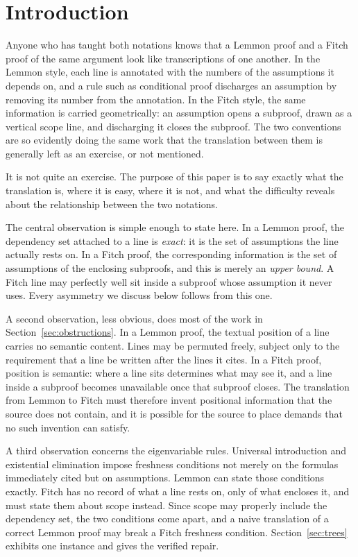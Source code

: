 \documentclass[11pt]{article}
\theoremstyle{plain}
\theoremstyle{definition}
\theoremstyle{remark}
\begin{document}
\section{Introduction}

Anyone who has taught both notations knows that a Lemmon proof and a Fitch
proof of the same argument look like transcriptions of one another. In the
Lemmon style, each line is annotated with the numbers of the assumptions it
depends on, and a rule such as conditional proof discharges an assumption by
removing its number from the annotation. In the Fitch style, the same
information is carried geometrically: an assumption opens a subproof, drawn as
a vertical scope line, and discharging it closes the subproof. The two
conventions are so evidently doing the same work that the translation between
them is generally left as an exercise, or not mentioned.

It is not quite an exercise. The purpose of this paper is to say exactly what
the translation is, where it is easy, where it is not, and what the difficulty
reveals about the relationship between the two notations.

The central observation is simple enough to state here. In a Lemmon proof, the
dependency set attached to a line is \emph{exact}: it is the set of
assumptions the line actually rests on. In a Fitch proof, the corresponding
information is the set of assumptions of the enclosing subproofs, and this is
merely an \emph{upper bound}. A Fitch line may perfectly well sit inside a
subproof whose assumption it never uses. Every asymmetry we discuss below
follows from this one.

A second observation, less obvious, does most of the work in
Section~\ref{sec:obstructions}. In a Lemmon proof, the textual position of a
line carries no semantic content. Lines may be permuted freely, subject only
to the requirement that a line be written after the lines it cites. In a Fitch
proof, position is semantic: where a line sits determines what may see it, and
a line inside a subproof becomes unavailable once that subproof closes. The
translation from Lemmon to Fitch must therefore invent positional information
that the source does not contain, and it is possible for the source to place
demands that no such invention can satisfy.

A third observation concerns the eigenvariable rules. Universal introduction
and existential elimination impose freshness conditions not merely on the
formulas immediately cited but on assumptions. Lemmon can state those
conditions exactly. Fitch has no record of what a line rests on, only of what
encloses it, and must state them about scope instead. Since scope may properly
include the dependency set, the two conditions come apart, and a naive
translation of a correct Lemmon proof may break a Fitch freshness condition.
Section~\ref{sec:trees} exhibits one instance and gives the verified repair.
\end{document}
